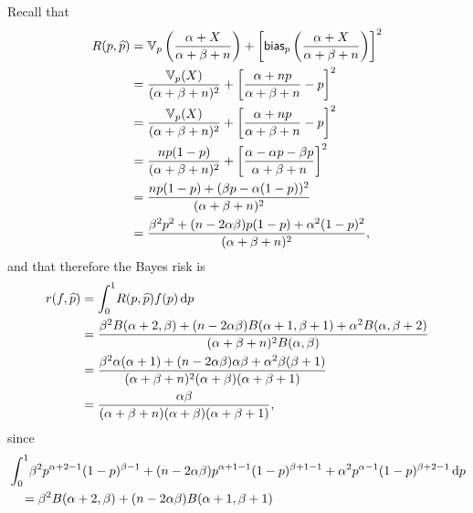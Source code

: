 \begin{ex}
\begin{enumerate}[(a)]
          Recall that
          \begin{align*}
            R(p,\widehat{p})
             & =\mathbb{V}_p\left(\frac{\alpha+X}{\alpha+\beta+n}\right)
            +\left[\textsf{bias}_p\left(\frac{\alpha+X}{\alpha+\beta+n}\right)\right]^2       \\
             & =\frac{\mathbb{V}_p(X)}{(\alpha+\beta+n)^2}
            +\left[\frac{\alpha+np}{\alpha+\beta+n}-p\right]^2                                \\
             & =\frac{\mathbb{V}_p(X)}{(\alpha+\beta+n)^2}
            +\left[\frac{\alpha+np}{\alpha+\beta+n}-p\right]^2                                \\
             & =\frac{np(1-p)}{(\alpha+\beta+n)^2}
            +\left[\frac{\alpha-\alpha p-\beta p}{\alpha+\beta+n}\right]^2                    \\
             & =\frac{np(1-p)+(\beta p - \alpha(1-p))^2}{(\alpha+\beta+n)^2}                  \\
             & =\frac{\beta^2p^2+(n-2\alpha\beta)p(1-p)+\alpha^2(1-p)^2}{(\alpha+\beta+n)^2},
          \end{align*}
          and that therefore the Bayes risk is
          \begin{align*}
            r(f,\widehat{p})
             & =\int_0^1\!R(p,\widehat{p})f(p)\,\mathrm{d}{p}                                                    \\
             & =\frac{\beta^2B(\alpha+2,\beta)
              +(n-2\alpha\beta)B(\alpha+1,\beta+1)
              +\alpha^2B(\alpha,\beta+2)}{(\alpha+\beta+n)^2B(\alpha, \beta)}                      \\
             & =\frac{\beta^2\alpha(\alpha+1)+(n-2\alpha\beta)\alpha\beta+\alpha^2\beta(\beta+1)}{
              (\alpha+\beta+n)^2(\alpha+\beta)(\alpha+\beta+1)}                                    \\
             & =\frac{\alpha\beta}{
              (\alpha+\beta+n)(\alpha+\beta)(\alpha+\beta+1)},                                     \\
          \end{align*}
          since
          \begin{align*}
             & \int_0^1\!
            \beta^2p^{\alpha+2-1}(1-p)^{\beta-1}
            +(n-2\alpha\beta)p^{\alpha+1-1}(1-p)^{\beta+1-1}
            +\alpha^2p^{\alpha-1}(1-p)^{\beta+2-1}\,\d{p} \\
             & \quad=\beta^2B(\alpha+2,\beta)
            +(n-2\alpha\beta)B(\alpha+1,\beta+1)

\end{align*}
\end{enumerate}
\end{ex}
